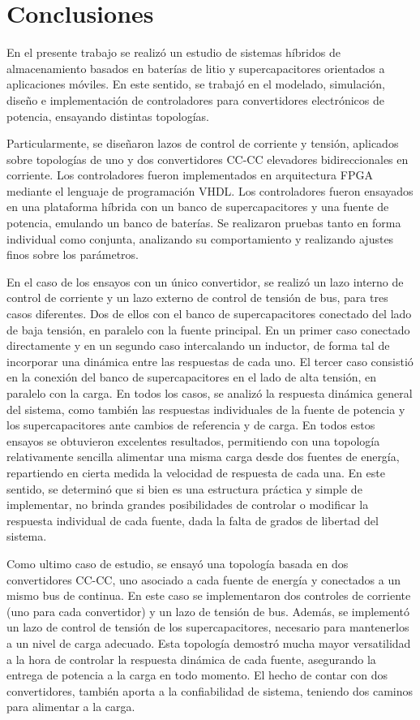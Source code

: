 \chapter*{Conclusiones}
\label{conclusiones}

En el presente trabajo se realizó un estudio de sistemas híbridos de almacenamiento basados en baterías de litio y supercapacitores orientados a aplicaciones móviles. En este sentido, se trabajó en el modelado, simulación, diseño e implementación de controladores para convertidores electrónicos de potencia, ensayando distintas topologías.

Particularmente, se diseñaron lazos de control de corriente y tensión, aplicados sobre topologías de uno y dos convertidores CC-CC elevadores bidireccionales en corriente. Los controladores fueron implementados en arquitectura FPGA mediante el lenguaje de programación VHDL. Los controladores fueron ensayados en una plataforma híbrida con un banco de supercapacitores y una fuente de potencia, emulando un banco de baterías. Se realizaron pruebas tanto en forma individual como conjunta, analizando su comportamiento y realizando ajustes finos sobre los parámetros.

En el caso de los ensayos con un único convertidor, se realizó un lazo interno de control de corriente y un lazo externo de control de tensión de bus, para tres casos diferentes. Dos de ellos con el banco de supercapacitores conectado del lado de baja tensión, en paralelo con la fuente principal. En un primer caso conectado directamente y en un segundo caso intercalando un inductor, de forma tal de incorporar una dinámica entre las respuestas de cada uno. El tercer caso consistió en la conexión del banco de supercapacitores en el lado de alta tensión, en paralelo con la carga. En todos los casos, se analizó la respuesta dinámica general del sistema, como también las respuestas individuales de la fuente de potencia y los supercapacitores ante cambios de referencia y de carga. En todos estos ensayos se obtuvieron excelentes resultados, permitiendo con una topología relativamente sencilla alimentar una misma carga desde dos fuentes de energía, repartiendo en cierta medida la velocidad de respuesta de cada una. En este sentido, se determinó que si bien es una estructura práctica y simple de implementar, no brinda grandes posibilidades de controlar o modificar la respuesta individual de cada fuente, dada la falta de grados de libertad del sistema.

Como ultimo caso de estudio, se ensayó una topología basada en dos convertidores CC-CC, uno asociado a cada fuente de energía y conectados a un mismo bus de continua. En este caso se implementaron dos controles de corriente (uno para cada convertidor) y un lazo de tensión de bus. Además, se implementó un lazo de control de tensión de los supercapacitores, necesario para mantenerlos a un nivel de carga adecuado. Esta topología demostró mucha mayor versatilidad a la hora de controlar la respuesta dinámica de cada fuente, asegurando la entrega de potencia a la carga en todo momento. El hecho de contar con dos convertidores, también aporta a la confiabilidad de sistema, teniendo dos caminos para alimentar a la carga. 

